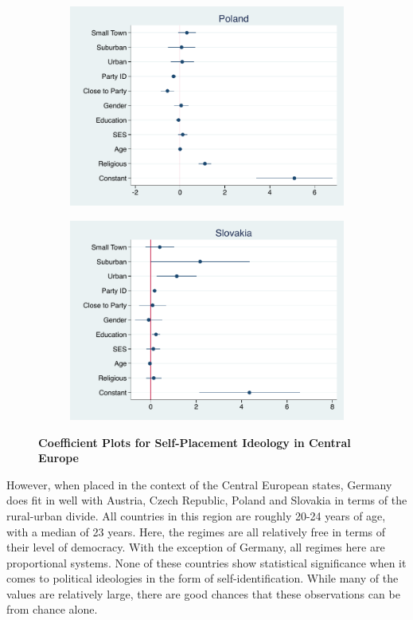 \documentclass[12pt, titlepage]{article}
\newcommand\tb{\textbf}
\begin{document}
\begin{figure}[H]
\begin{subfigure}[b]{0.475\textwidth}
		\includegraphics[width=\textwidth]{IdeologyCoef/Poland}
	\end{subfigure}
	\quad
	\begin{subfigure}[b]{0.475\textwidth}   
		\centering 
		\includegraphics[width=\textwidth]{IdeologyCoef/Slovakia}
	\end{subfigure}
	\caption[ \tb{Self-Placement Ideology - Central Europe} ]
	{\tb {Coefficient Plots for Self-Placement Ideology in Central Europe} }
	\label{CentEuro}
\end{figure}


However, when placed in the context of the Central European states, Germany does fit in well with Austria, Czech Republic, Poland and Slovakia in terms of the rural-urban divide. All countries in this region are roughly 20-24 years of age, with a median of 23 years. Here, the regimes are all relatively free in terms of their level of democracy. With the exception of Germany, all regimes here are proportional systems. None of these countries show statistical significance when it comes to political ideologies in the form of self-identification. While many of the values are relatively large, there are good chances that these observations can be from chance alone. 
\end{document}
